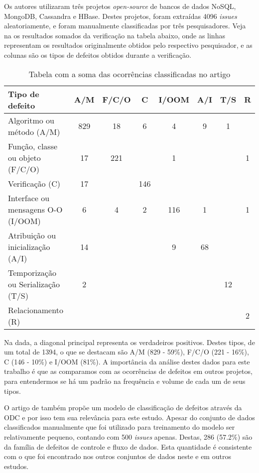 Os autores utilizaram três projetos \textit{open-source} de bancos de dados NoSQL, MongoDB, Cassandra e HBase. Destes projetos, foram extraídas 4096 \textit{issues} aleatoriamente, e foram manualmente classificadas por três pesquisadores. Veja na  os resultados somados da verificação na tabela abaixo, onde as linhas representam os resultados originalmente obtidos pelo respectivo pesquisador, e as colunas são os tipos de defeitos obtidos durante a verificação.

\begin{table}[H]
    \centering
    \begin{tabularx}{\textwidth}{ X|c|c|c|c|c|c|c }
        \textbf{Tipo de defeito} & \textbf{A/M} & \textbf{F/C/O} & \textbf{C} & \textbf{I/OOM} & \textbf{A/I} & \textbf{T/S} & \textbf{R} \\
        \hline
        Algoritmo ou método (A/M) & 829 & 18 & 6 & 4 & 9 & 1 & \\
        \hline
        Função, classe ou objeto (F/C/O) & 17 & 221 &  & 1 &  &  & 1 \\
        \hline
        Verificação (C) & 17 &  & 146 &  &  & & \\
        \hline
        Interface ou mensagens O-O (I/OOM) & 6 & 4 & 2 & 116 & 1 &  & 1 \\
        \hline
        Atribuição ou inicialização (A/I) & 14 &  &  & 9 & 68 & & \\
        \hline
        Temporização ou Serialização (T/S) & 2 &  &  &  &  & 12 & \\
        \hline
        Relacionamento (R) & & & & & & & 2 \\
    \end{tabularx}
    \caption{Tabela com a soma das ocorrências classificadas no artigo}
    \label{table:occurrences_sum_classified_in_article}
\end{table}

Na  dada, a diagonal principal representa os verdadeiros positivos. Destes tipos, de um total de 1394, o que se destacam são A/M (829 - 59\%), F/C/O (221 - 16\%), C (146 - 10\%) e I/OOM (81\%). A importância da análise destes dados para este trabalho é que as comparamos com as ocorrências de defeitos em outros projetos, para entendermos se há um padrão na frequência e volume de cada um de seus tipos.

O artigo de \cite{automatic_defect_categorization} também propõe um modelo de classificação de defeitos através da ODC e por isso tem sua relevância para este estudo. Apesar do conjunto de dados classificados manualmente que foi utilizado para treinamento do modelo ser relativamente pequeno, contando com 500 \textit{issues} apenas. Destas, 286 (57.2\%) são da família de defeitos de controle e fluxo de dados. Esta quantidade é consistente com o que foi encontrado nos outros conjuntos de dados neste e em outros estudos.
